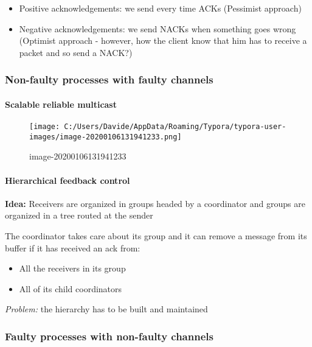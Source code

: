 \begin{itemize}
\itemsep1pt\parskip0pt
\item
  Positive acknowledgements: we send every time ACKs (Pessimist
  approach)
\item
  Negative acknowledgements: we send NACKs when something goes wrong
  (Optimist approach - however, how the client know that him has to
  receive a packet and so send a NACK?)
\end{itemize}

\subsubsection{Non-faulty processes with faulty
channels}\label{non-faulty-processes-with-faulty-channels}

\paragraph{Scalable reliable
multicast}\label{scalable-reliable-multicast}

\begin{figure}[htbp]
\centering
\texttt{[image: C:/Users/Davide/AppData/Roaming/Typora/typora-user-images/image-20200106131941233.png]}
\caption{image-20200106131941233}
\end{figure}

\paragraph{Hierarchical feedback
control}\label{hierarchical-feedback-control}

\textbf{Idea:} Receivers are organized in groups headed by a coordinator
and groups are organized in a tree routed at the sender

The coordinator takes care about its group and it can remove a message
from its buffer if it has received an ack from:

\begin{itemize}
\itemsep1pt\parskip0pt
\item
  All the receivers in its group
\item
  All of its child coordinators
\end{itemize}

\emph{Problem:} the hierarchy has to be built and maintained

\subsubsection{Faulty processes with non-faulty
channels}\label{faulty-processes-with-non-faulty-channels}

